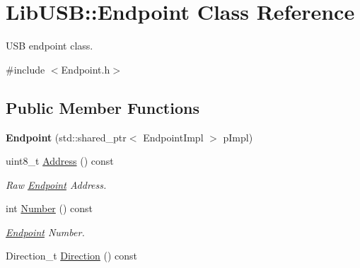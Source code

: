 \hypertarget{class_lib_u_s_b_1_1_endpoint}{\section{Lib\-U\-S\-B\-:\-:Endpoint Class Reference}
\label{class_lib_u_s_b_1_1_endpoint}
}


U\-S\-B endpoint class.  




{\ttfamily \#include $<$Endpoint.\-h$>$}

\subsection*{Public Member Functions}
\begin{DoxyCompactItemize}
\item 
\hypertarget{class_lib_u_s_b_1_1_endpoint_a6916ca81cbe5dc84487041ef4269afb6}{{\bfseries Endpoint} (std\-::shared\-\_\-ptr$<$ Endpoint\-Impl $>$ p\-Impl)}\label{class_lib_u_s_b_1_1_endpoint_a6916ca81cbe5dc84487041ef4269afb6}

\item 
\hypertarget{class_lib_u_s_b_1_1_endpoint_a87324673d0521e6a87181d734843797a}{uint8\-\_\-t \hyperlink{class_lib_u_s_b_1_1_endpoint_a87324673d0521e6a87181d734843797a}{Address} () const }\label{class_lib_u_s_b_1_1_endpoint_a87324673d0521e6a87181d734843797a}

\begin{DoxyCompactList}\small\item\em Raw \hyperlink{class_lib_u_s_b_1_1_endpoint}{Endpoint} Address. \end{DoxyCompactList}\item 
\hypertarget{class_lib_u_s_b_1_1_endpoint_a16f5d238ac0f007dbf22b51b2521278c}{int \hyperlink{class_lib_u_s_b_1_1_endpoint_a16f5d238ac0f007dbf22b51b2521278c}{Number} () const }\label{class_lib_u_s_b_1_1_endpoint_a16f5d238ac0f007dbf22b51b2521278c}

\begin{DoxyCompactList}\small\item\em \hyperlink{class_lib_u_s_b_1_1_endpoint}{Endpoint} Number. \end{DoxyCompactList}\item 
\hypertarget{class_lib_u_s_b_1_1_endpoint_a27e288784eaf72a217435e8f5d920d43}{Direction\-\_\-t \hyperlink{class_lib_u_s_b_1_1_endpoint_a27e288784eaf72a217435e8f5d920d43}{Direction} () const }\label{class_lib_u_s_b_1_1_endpoint_a27e288784eaf72a217435e8f5d920d43}


\end{DoxyCompactItemize}
